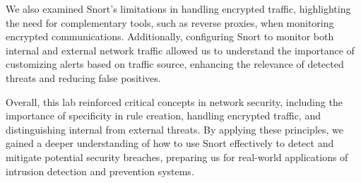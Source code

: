 \documentclass[a4paper,11pt]{article} %
\begin{document}
We also examined Snort’s limitations in handling encrypted traffic, highlighting the need for complementary tools, such as reverse proxies, when monitoring encrypted communications. Additionally, configuring Snort to monitor both internal and external network traffic allowed us to understand the importance of customizing alerts based on traffic source, enhancing the relevance of detected threats and reducing false positives.

Overall, this lab reinforced critical concepts in network security, including the importance of specificity in rule creation, handling encrypted traffic, and distinguishing internal from external threats. By applying these principles, we gained a deeper understanding of how to use Snort effectively to detect and mitigate potential security breaches, preparing us for real-world applications of intrusion detection and prevention systems.
\end{document}
